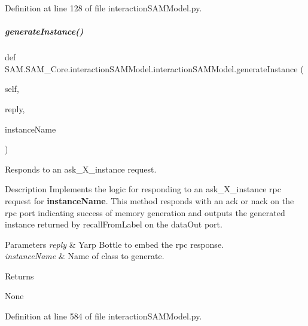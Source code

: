 Definition at line 128 of file interaction\+S\+A\+M\+Model.\+py.

\mbox{\label{group__icubclient__SAM__Core_ab5347106cc5a047fb54e41cd2488df88}} 
\subparagraph{\texorpdfstring{generate\+Instance()}{generateInstance()}}
{\footnotesize\ttfamily def S\+A\+M.\+S\+A\+M\+\_\+\+Core.\+interaction\+S\+A\+M\+Model.\+interaction\+S\+A\+M\+Model.\+generate\+Instance (\begin{DoxyParamCaption}\item[{}]{self,  }\item[{}]{reply,  }\item[{}]{instance\+Name }\end{DoxyParamCaption})}



Responds to an ask\+\_\+\+X\+\_\+instance request. 

\begin{DoxyParagraph}{Description}
Implements the logic for responding to an {\ttfamily ask\+\_\+\+X\+\_\+instance} rpc request for {\bfseries instance\+Name}. This method responds with an {\ttfamily ack} or {\ttfamily nack} on the rpc port indicating success of memory generation and outputs the generated instance returned by recall\+From\+Label on the {\ttfamily data\+Out} port.
\end{DoxyParagraph}

\begin{DoxyParams}{Parameters}
{\em reply} & Yarp Bottle to embed the rpc response. \\
\hline
{\em instance\+Name} & Name of class to generate.\\
\hline
\end{DoxyParams}
\begin{DoxyReturn}{Returns}


None 
\end{DoxyReturn}


Definition at line 584 of file interaction\+S\+A\+M\+Model.\+py.

